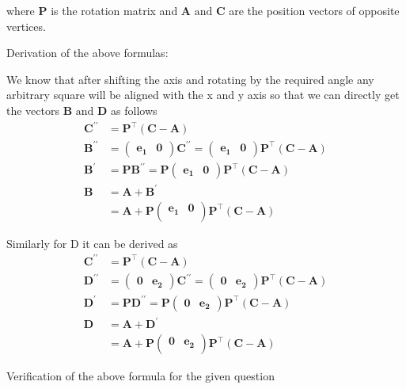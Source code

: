 \documentclass[12pt]{article}
\providecommand{\brak}[1]{\ensuremath{\left(#1\right)}}
\newcommand{\myvec}[1]{\ensuremath{\begin{pmatrix}#1\end{pmatrix}}}
\let\vec\mathbf
\begin{document}
where $\vec{P}$ is the rotation matrix and $\vec{A} \text{ and } \vec{C}$ are the position vectors of opposite vertices.

Derivation of the above formulas:

We know that after shifting the axis and rotating by the required angle any arbitrary square will be aligned with the x and y axis so that we can directly get the vectors $\vec{B} \text{ and } \vec{D}$ as follows
\begin{align}
\vec{C^{\prime\prime}} &= \vec{P}^\top \brak{\vec{C} - \vec{A}}\\
\vec{B^{\prime\prime}} &= \myvec{
\vec{e_{1}} & \vec{0}
}\vec{C^{\prime\prime}} = \myvec{
\vec{e_{1}} & \vec{0}
}\vec{P}^\top \brak{\vec{C} - \vec{A}}\\
\vec{B^{\prime}} &= \vec{P} \vec{B^{\prime\prime}}  = \vec{P}\myvec{
\vec{e_{1}} & \vec{0}
}\vec{P}^\top \brak{\vec{C} - \vec{A}}\\
\vec{B} &= \vec{A}+\vec{B^{\prime}}\\
 &= \vec{A} + \vec{P}\myvec{
\vec{e_{1}}&\vec{0}\\
}
\vec{P}^\top\brak{\vec{C}-\vec{A}}
\end{align}

Similarly for D it can be derived as
\begin{align}
\vec{C^{\prime\prime}} &= \vec{P}^\top \brak{\vec{C} - \vec{A}}\\
\vec{D^{\prime\prime}} &= \myvec{
\vec{0} & \vec{e_{2}}
}\vec{C^{\prime\prime}} = \myvec{
\vec{0} & \vec{e_{2}}
}\vec{P}^\top \brak{\vec{C} - \vec{A}}\\
\vec{D^{\prime}} &= \vec{P} \vec{D^{\prime\prime}} = \vec{P} \myvec{
\vec{0} & \vec{e_{2}}
}\vec{P}^\top \brak{\vec{C} - \vec{A}}\\
\vec{D} &= \vec{A}+\vec{D^{\prime}}\\
 &= \vec{A} + \vec{P}\myvec{
\vec{0}&\vec{e_{2}}\\
}
\vec{P}^\top\brak{\vec{C}-\vec{A}}
\end{align}


Verification of the above formula for the given question
\end{document}
